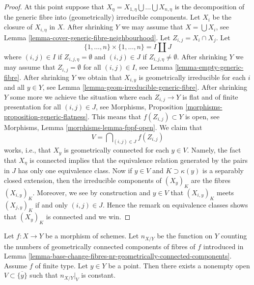 \begin{proof}
\medskip\noindent
At this point suppose that
$X_\eta = X_{1, \eta} \bigcup \ldots \bigcup X_{n, \eta}$
is the decomposition of the generic fibre into
(geometrically) irreducible components.
Let $X_i$ be the closure of $X_{i, \eta}$ in $X$.
After shrinking $Y$ we may assume that
$X = \bigcup X_i$, see
Lemma \ref{lemma-cover-generic-fibre-neighbourhood}.
Let $Z_{i, j} = X_i \cap X_j$.
Let
$$
\{1, \ldots, n\} \times \{1, \ldots, n\} = I \amalg J
$$
where $(i, j) \in I$ if $Z_{i, j, \eta} = \emptyset$ and
$(i, j) \in J$ if $Z_{i, j, \eta} \not = \emptyset$.
After shrinking $Y$ we may assume that $Z_{i, j} = \emptyset$
for all $(i, j) \in I$, see
Lemma \ref{lemma-empty-generic-fibre}.
After shrinking $Y$ we obtain that $X_{i, y}$
is geometrically irreducible for each $i$ and all $y \in Y$, see
Lemma \ref{lemma-geom-irreducible-generic-fibre}.
After shrinking $Y$ some more we achieve the situation where
each $Z_{i, j} \to Y$ is flat and of finite presentation for
all $(i, j) \in J$, see
Morphisms, Proposition \ref{morphisms-proposition-generic-flatness}.
This means that $f(Z_{i, j}) \subset Y$ is open, see
Morphisms, Lemma \ref{morphisms-lemma-fppf-open}.
We claim that
$$
V  = \bigcap\nolimits_{(i, j) \in J} f(Z_{i, j})
$$
works, i.e., that $X_y$ is geometrically connected for each
$y \in V$. Namely, the fact that $X_\eta$ is connected implies that
the equivalence relation generated by the pairs in $J$ has only
one equivalence class. Now if $y \in V$ and $K \supset \kappa(y)$
is a separably closed extension, then the irreducible components
of $(X_y)_K$ are the fibres $(X_{i, y})_K$. Moreover, we see by
construction and $y \in V$ that $(X_{i, y})_K$ meets $(X_{j, y})_K$
if and only $(i, j) \in J$. Hence the remark on equivalence classes
shows that $(X_y)_K$ is connected and we win.
\end{proof}

\begin{lemma}
\label{lemma-nr-geom-connected-components-good}
Let $f : X \to Y$ be a morphism of schemes. Let
$n_{X/Y}$ be the function on $Y$ counting the numbers of geometrically
connected components of fibres of $f$ introduced in
Lemma \ref{lemma-base-change-fibres-nr-geometrically-connected-components}.
Assume $f$ of finite type.
Let $y \in Y$ be a point. Then there exists a nonempty open
$V \subset \overline{\{y\}}$ such that $n_{X/Y}|_V$ is constant.
\end{lemma}

